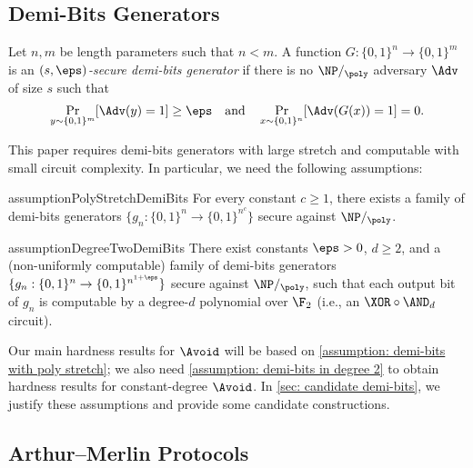 \subsection{Demi-Bits Generators}\label{sec: def of demi-bits}
\begin{definition}
    Let $n,m$ be length parameters such that $n<m$. A function $G:\{0,1\}^n\to \{0,1\}^m$ is an \emph{$(s,\eps)$-secure demi-bits generator} if there is no $\NP/_\poly$ adversary $\Adv$ of size $s$ such that 
    \begin{align*}
        \Pr_{y\sim\{0,1\}^m}[\Adv(y)=1]\ge\eps \quad\text{and}\quad\Pr_{x\sim\{0,1\}^n}[\Adv(G(x))=1]=0.
    \end{align*}
\end{definition}


This paper requires demi-bits generators with large stretch and computable with small circuit complexity. In particular, we need the following assumptions:
\begin{restatable}{assumption}{PolyStretchDemiBits}\label{assumption: demi-bits with poly stretch}
    For every constant $c\ge 1$, there exists a family of demi-bits generators $\{g_n: \{0, 1\}^n \to \{0, 1\}^{n^c}\}$ secure against $\NP/_\poly$.
\end{restatable}

\begin{restatable}{assumption}{DegreeTwoDemiBits}\label{assumption: demi-bits in degree 2}
    There exist constants $\eps > 0$, $d\ge 2$, and a (non-uniformly computable) family of demi-bits generators $\{g_n: \{0, 1\}^n \to \{0, 1\}^{n^{1+\eps}}\}$ secure against $\NP/_\poly$, such that each output bit of $g_n$ is computable by a degree-$d$ polynomial over $\F_2$ (i.e., an $\XOR\circ\AND_d$ circuit).
\end{restatable}

Our main hardness results for $\Avoid$ will be based on \autoref{assumption: demi-bits with poly stretch}; we also need \autoref{assumption: demi-bits in degree 2} to obtain hardness results for constant-degree $\Avoid$. In \autoref{sec: candidate demi-bits}, we justify these assumptions and provide some candidate constructions.





\subsection{Arthur--Merlin Protocols}

